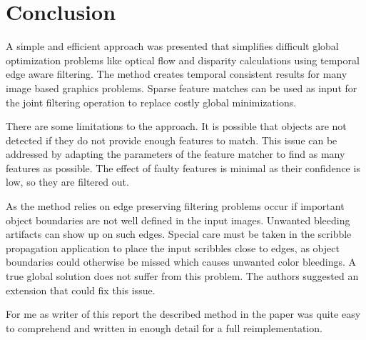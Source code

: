 \documentclass{utue} %
\begin{document}
\section{Conclusion}
A simple and efficient approach was presented that simplifies difficult global
optimization problems like optical flow and disparity calculations using
temporal edge aware filtering. The method creates temporal consistent results
for many image based graphics problems. Sparse feature matches can be used as
input for the joint filtering operation to replace costly global minimizations.

There are some limitations to the approach. It is possible that objects are not
detected if they do not provide enough features to match. This issue can be
addressed by adapting the parameters of the feature matcher to find as many
features as possible. The effect of faulty features is minimal as their
confidence is low, so they are filtered out.

As the method relies on edge preserving filtering problems occur if important
object boundaries are not well defined in the input images. Unwanted bleeding
artifacts can show up on such edges. Special care must be taken in the scribble
propagation application to place the input scribbles close to edges, as object
boundaries could otherwise be missed which causes unwanted color bleedings. A
true global solution does not suffer from this problem. The authors suggested an
extension that could fix this issue.

For me as writer of this report the described method in the paper was quite easy
to comprehend and written in enough detail for a full reimplementation.



\end{document}
